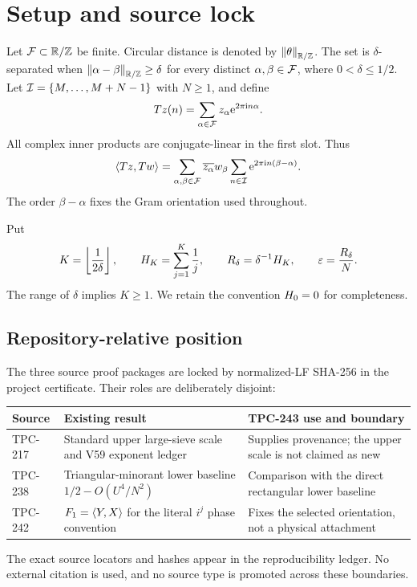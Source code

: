 \section{Setup and source lock}\label{sec:setup}

Let $\mathcal{F}\subset\mathbb{R}/\mathbb{Z}$ be finite.  Circular distance is denoted by
$\left\lVert \theta\right\rVert_{\mathbb{R}/\mathbb{Z}}$.  The set is $\delta$-separated when
$\left\lVert \alpha-\beta\right\rVert_{\mathbb{R}/\mathbb{Z}}\geq\delta$ for every distinct
$\alpha,\beta\in\mathcal{F}$, where $0<\delta\leq1/2$.  Let
$\mathcal{I}=\{M,\ldots,M+N-1\}$ with $N\geq1$, and define
\[
  Tz(n)=\sum_{\alpha\in\mathcal{F}}z_\alpha\mathrm{e}^{2\pi\mathrm{i} n\alpha}.
\]
All complex inner products are conjugate-linear in the first slot.  Thus
\[
  \left\langle Tz,Tw\right\rangle
  =\sum_{\alpha,\beta\in\mathcal{F}}
  \overline{z_\alpha}w_\beta
  \sum_{n\in\mathcal{I}}\mathrm{e}^{2\pi\mathrm{i} n(\beta-\alpha)}.
\]
The order $\beta-\alpha$ fixes the Gram orientation used throughout.

Put
\[
K=\left\lfloor\frac1{2\delta}\right\rfloor,
\qquad
H_K=\sum_{j=1}^{K}\frac1j,
\qquad
R_{\delta}=\delta^{-1}H_K,
\qquad
\varepsilon=\frac{R_{\delta}}{N}.
\]
\EndAccSupp{}
The range of $\delta$ implies $K\geq1$.  We retain the convention
$H_0=0$ for completeness.

\subsection{Repository-relative position}

The three source proof packages are locked by normalized-LF SHA-256 in the
project certificate.  Their roles are deliberately disjoint:

\begin{center}
\small
\begin{tabularx}{\textwidth}{@{}l >{\raggedright\arraybackslash}X >{\raggedright\arraybackslash}X@{}}
\toprule
Source & Existing result & TPC-243 use and boundary \\
\midrule
TPC-217 & Standard upper large-sieve scale and V59 exponent ledger & Supplies provenance; the upper scale is not claimed as new \\
TPC-238 & Triangular-minorant lower baseline $1/2-O(U^4/N^2)$ & Comparison with the direct rectangular lower baseline \\
TPC-242 & $F_1=\left\langle Y,X\right\rangle$ for the literal $i^j$ phase convention & Fixes the selected orientation, not a physical attachment \\
\bottomrule
\end{tabularx}
\end{center}

The exact source locators and hashes appear in the reproducibility ledger.
No external citation is used, and no source type is promoted across these
boundaries.
